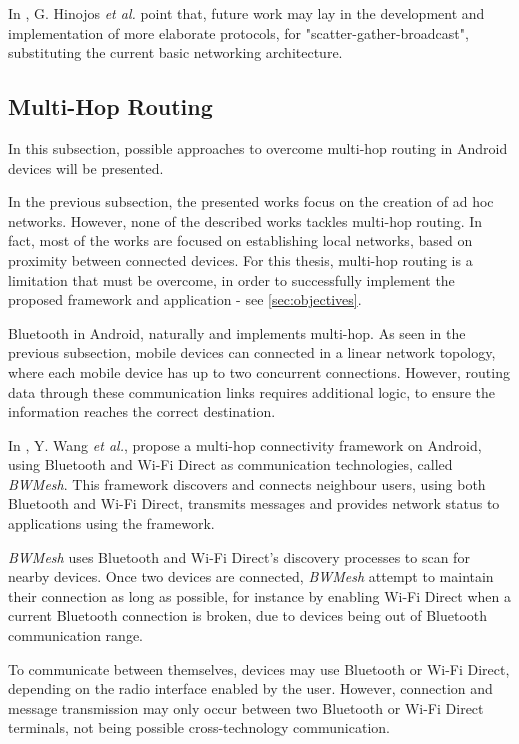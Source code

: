 In \cite{bluehoc}, G. Hinojos \textit{et al.} point that, future work may lay in the development and implementation of more elaborate protocols, for "scatter-gather-broadcast", substituting the current basic networking architecture.

\subsection{Multi-Hop Routing}

In this subsection, possible approaches to overcome multi-hop routing in Android devices will be presented.

In the previous subsection, the presented works focus on the creation of ad hoc networks. However, none of the described works tackles multi-hop routing. In fact, most of the works are focused on establishing local networks, based on proximity between connected devices. For this thesis, multi-hop routing is a limitation that must be overcome, in order to successfully implement the proposed framework and application - see \ref{sec:objectives}.

Bluetooth in Android, naturally and implements multi-hop. As seen in the previous subsection, mobile devices can connected in a linear network topology, where each mobile device has up to two concurrent connections. However, routing data through these communication links requires additional logic, to ensure the information reaches the correct destination.

In \cite{bwmesh}, Y. Wang \textit{et al.}, propose a multi-hop connectivity framework on Android, using Bluetooth and Wi-Fi Direct as communication technologies, called \textit{BWMesh}. This framework discovers and connects neighbour users, using both Bluetooth and Wi-Fi Direct, transmits messages and provides network status to applications using the framework.

\textit{BWMesh} uses Bluetooth and Wi-Fi Direct's discovery processes to scan for nearby devices. Once two devices are connected, \textit{BWMesh} attempt to maintain their connection as long as possible, for instance by enabling Wi-Fi Direct when a current Bluetooth connection is broken, due to devices being out of Bluetooth communication range.

To communicate between themselves, devices may use Bluetooth or Wi-Fi Direct, depending on the radio interface enabled by the user. However, connection and message transmission may only occur between two Bluetooth or Wi-Fi Direct terminals, not being possible cross-technology communication.

